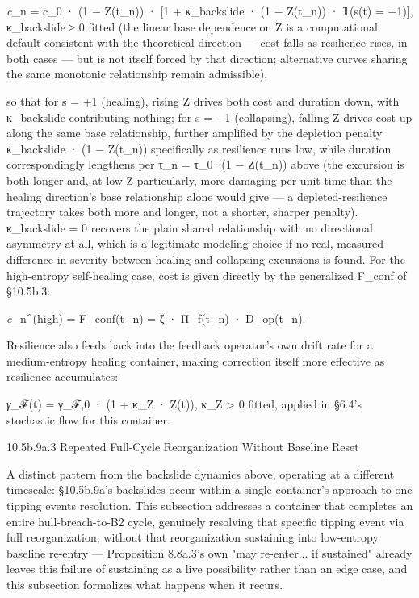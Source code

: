 \documentclass[
]{article}
\begin{document}
\emph{c}\_n = c\_0 · (1 − Z(t\_n)) · {[}1 + κ\_backslide · (1 − Z(t\_n))
· 𝟙(s(t) = −1){]}, κ\_backslide ≥ 0 fitted (the linear base dependence
on Z is a computational default consistent with the theoretical
direction --- cost falls as resilience rises, in both cases --- but is
not itself forced by that direction; alternative curves sharing the same
monotonic relationship remain admissible),

so that for s = +1 (healing), rising Z drives both cost and duration
down, with κ\_backslide contributing nothing; for s = −1 (collapsing),
falling Z drives cost up along the same base relationship, further
amplified by the depletion penalty κ\_backslide · (1 − Z(t\_n))
specifically as resilience runs low, while duration correspondingly
lengthens per τ\_n = τ\_0·(1 − Z(t\_n)) above (the excursion is both
longer and, at low Z particularly, more damaging per unit time than the
healing direction's base relationship alone would give --- a
depleted-resilience trajectory takes both more and longer, not a
shorter, sharper penalty). κ\_backslide = 0 recovers the plain shared
relationship with no directional asymmetry at all, which is a legitimate
modeling choice if no real, measured difference in severity between
healing and collapsing excursions is found. For the high-entropy
self-healing case, cost is given directly by the generalized F\_conf of
§10.5b.3:

\emph{c}\_n\^{}(high) = F\_conf(t\_n) = ζ · Π\_f(t\_n) · D\_op(t\_n).

Resilience also feeds back into the feedback operator's own drift rate
for a medium-entropy healing container, making correction itself more
effective as resilience accumulates:

\emph{γ}\_ℱ(t) = γ\_ℱ,0 · (1 + κ\_Z · Z(t)), κ\_Z \textgreater{} 0
fitted, applied in §6.4's stochastic flow for this container.

10.5b.9a.3 Repeated Full-Cycle Reorganization Without Baseline Reset

A distinct pattern from the backslide dynamics above, operating at a
different timescale: §10.5b.9a's backslides occur within a single
container's approach to one tipping events resolution. This subsection
addresses a container that completes an entire hull-breach-to-B2 cycle,
genuinely resolving that specific tipping event via full reorganization,
without that reorganization sustaining into low-entropy baseline
re-entry --- Proposition 8.8a.3's own "may re-enter... if sustained"
already leaves this failure of sustaining as a live possibility rather
than an edge case, and this subsection formalizes what happens when it
recurs.
\end{document}
